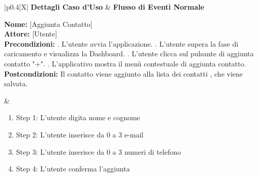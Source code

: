 \documentclass[a4paper,12pt]{article}
\begin{document}
    \begin{table}[htbp]
        \centering
        \begin{tabularx}{\textwidth}{|p{0.4\textwidth}|X|}
            \hline
            \textbf{Dettagli Caso d'Uso} & \textbf{Flusso di Eventi Normale} \\
            \hline
            \parbox[t]{0.38\textwidth}{%
                \textbf{Nome:} [Aggiunta Contatto] \\[1ex]
                \textbf{Attore:} [Utente] \\[1ex]
                \textbf{Precondizioni:} . L'utente avvia l'applicazione. . L'utente supera la fase di caricamento e visualizza la Dashboard. . L'utente clicca sul pulsante di aggiunta contatto "+". . L'applicativo mostra il menù contestuale di aggiunta contatto. \\[1ex]
                \textbf{Postcondizioni:} \newline Il contatto viene aggiunto alla lista dei contatti , che viene salvata.\newline
            }
            &
            \parbox[t]{\linewidth}{%
                \begin{enumerate}[noitemsep, leftmargin=*]
                    \item Step 1: L'utente digita nome e cognome
                    \item Step 2: L'utente inserisce da 0 a 3 e-mail
                    \item Step 3: L'utente inserisce da 0 a 3 numeri di telefono
                    \item Step 4: L'utente conferma l'aggiunta
                \end{enumerate}
            } \\
            \hline
\end{tabularx}
\end{table}
\end{document}
